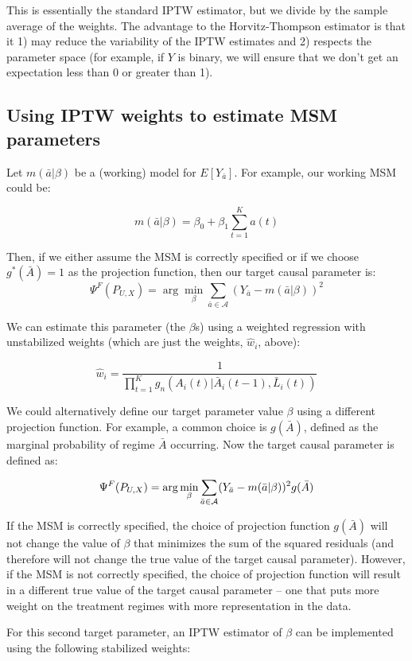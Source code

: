 \documentclass[answers]{exam}
\begin{document}
\noindent This is essentially the standard IPTW estimator, but we divide by the sample average of the weights. The advantage to the Horvitz-Thompson estimator is that it 1) may reduce the variability of the IPTW estimates and 2) respects the parameter space (for example, if $Y$ is binary, we will ensure that we don't get an expectation less than 0 or greater than 1).

\subsection{Using IPTW weights to estimate MSM parameters}

Let $m(\bar{a}|\beta)$ be a (working) model for $E[Y_{\bar{a}}]$. For example, our working MSM could be:

\[
m(\bar{a}|\beta) =\beta_0+\beta_1\sum_{t=1}^Ka(t)
\] 

\noindent Then, if we either assume the MSM is correctly specified or if we choose $g^*(\bar{A})=1$ as the projection function, then our target causal parameter is:
\[
\Psi^F(P_{U,X})=\arg\min_\beta \sum_{\bar{a} \in \mathcal{A}}(Y_{\bar{a}}-m(\bar{a}|\beta))^2
\]

\noindent We can estimate this parameter (the $\beta$s) using a weighted regression with unstabilized weights (which are just the weights, $\hat{w}_i$, above):

\[
\hat{w}_i = \frac{1}{\prod_{t=1}^Kg_n(A_i(t)|\bar{A}_i(t-1), \bar{L}_i(t))}
\]

\noindent We could alternatively define our target parameter value $\beta$ using a different projection function. For example, a common choice is $g(\bar{A})$, defined as the marginal probability of regime $\bar{A}$ occurring. Now the target causal parameter is defined as:

\[
\Psi^F(P_{U,X})=\arg\min_\beta \sum_{\bar{a} \in {\cal A}}(Y_{\bar{a}}-m(\bar{a}|\beta))^2 g(\bar{A})
\]

\noindent If the MSM is correctly specified, the choice of projection function $g(\bar{A})$ will not change the value of $\beta$ that minimizes the sum of the squared residuals (and therefore will not change the true value of the target causal parameter). However, if the MSM is not correctly specified, the choice of projection function will result in a different true value of the target causal parameter -- one that puts more weight on the treatment regimes with more representation in the data.

\noindent For this second target parameter, an IPTW estimator of $\beta$ can be implemented using the following stabilized weights:
\end{document}

